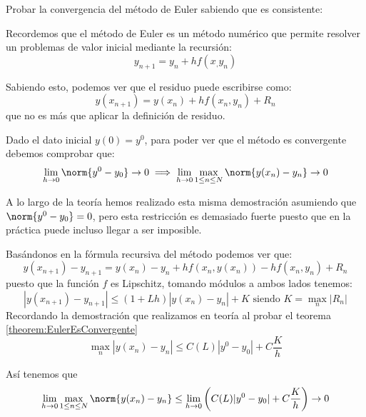 \begin{problem}[1]
Probar la convergencia del método de Euler sabiendo que es consistente:

\solution

Recordemos que el método de Euler es un método numérico que permite resolver un problemas de valor inicial mediante la recursión:
\[y_{n+1} = y_n + hf(x_,y_n)\]

Sabiendo esto, podemos ver que el residuo puede escribirse como:
\[y(x_{n+1}) = y(x_n) + hf(x_n,y_n) + R_n\]
que no es más que aplicar la definición de residuo.

Dado el dato inicial $y(0)=y^0$, para poder ver que el método es convergente debemos comprobar que:
\[\lim_{h \to 0 } \norm{y^0-y_0} \to 0 \implies \lim_{h\to 0} \max_{1 \leq n \leq N}\norm{y(x_n)-y_n} \to 0\]

\obs A lo largo de la teoría hemos realizado esta misma demostración asumiendo que $\norm{y^0-y_0} = 0$, pero esta restricción es demasiado fuerte puesto que en la práctica puede incluso llegar a ser imposible.

Basándonos en la fórmula recursiva del método podemos ver que:
\[y(x_{n+1}) - y_{n+1} = y(x_n) - y_n + hf(x_n,y(x_n)) -hf(x_n,y_n) + R_n\]
puesto que la función $f$ es Lipschitz, tomando módulos a ambos lados tenemos:
\[|y(x_{n+1})-y_{n+1}| \leq (1+Lh)|y(x_n)-y_n| + K \text{ siendo }K=\max_n|R_n|\]
Recordando la demostración que realizamos en teoría al probar el teorema \ref{theorem:EulerEsConvergente}
\[\max_n|y(x_n)-y_n| \leq C(L)|y^0-y_0|+C\frac{K}{h}\]

Así tenemos que
\[\lim_{h\to 0} \max_{1 \leq n \leq N}\norm{y(x_n)-y_n} \leq \lim_{h \to 0}\left( C(L)|y^0-y_0|+C\frac{K}{h}\right) \to 0\]
\end{problem}

